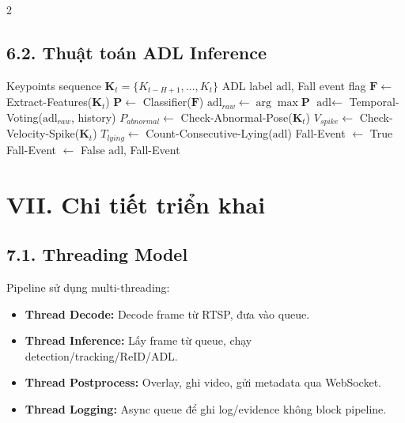 \documentclass[a4paper,13pt]{article}
\begin{document}
\begin{multicols}{2}
\subsection*{6.2. Thuật toán ADL Inference}

\begin{algorithm}[H]
\caption{ADL Inference with Temporal Smoothing}
\label{alg:adl}
\begin{algorithmic}[1]
\REQUIRE Keypoints sequence $\mathbf{K}_t = \{K_{t-H+1}, \ldots, K_t\}$
\ENSURE ADL label $\text{adl}$, Fall event flag
\STATE $\mathbf{F} \gets$ Extract-Features($\mathbf{K}_t$) 
\STATE $\mathbf{P} \gets$ Classifier($\mathbf{F}$) 
\STATE $\text{adl}_{raw} \gets \arg\max \mathbf{P}$
\STATE $\text{adl} \gets$ Temporal-Voting($\text{adl}_{raw}$, history)
\STATE $P_{abnormal} \gets$ Check-Abnormal-Pose($\mathbf{K}_t$)
\STATE $V_{spike} \gets$ Check-Velocity-Spike($\mathbf{K}_t$)
\STATE $T_{lying} \gets$ Count-Consecutive-Lying($\text{adl}$)
    \STATE Fall-Event $\gets$ True
\ELSE
    \STATE Fall-Event $\gets$ False
\ENDIF
\RETURN $\text{adl}$, Fall-Event
\end{algorithmic}
\end{algorithm}

\section*{VII. Chi tiết triển khai}

\subsection*{7.1. Threading Model}
Pipeline sử dụng multi-threading:
\begin{itemize}
    \item \textbf{Thread Decode:} Decode frame từ RTSP, đưa vào queue.
    \item \textbf{Thread Inference:} Lấy frame từ queue, chạy detection/tracking/ReID/ADL.
    \item \textbf{Thread Postprocess:} Overlay, ghi video, gửi metadata qua WebSocket.
    \item \textbf{Thread Logging:} Async queue để ghi log/evidence không block pipeline.
\end{itemize}


\end{multicols}
\end{document}
